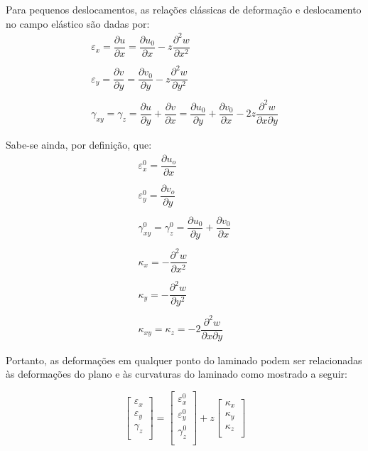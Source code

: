 Para pequenos deslocamentos, as relações clássicas de deformação e deslocamento no campo elástico são dadas por:
\begin{equation} \label{Strain_Displacement}
\begin{gathered}
\varepsilon_{x} = \dfrac{\partial u}{\partial x} = \dfrac{\partial u_0}{\partial x} - z\dfrac{\partial^2 w}{\partial x^2}\\~\\
\varepsilon_{y} = \dfrac{\partial v}{\partial y} = \dfrac{\partial v_0}{\partial y} - z\dfrac{\partial^2 w}{\partial y^2}\\~\\
\gamma_{xy} = \gamma_z = \dfrac{\partial u}{\partial y} + \dfrac{\partial v}{\partial x} = \dfrac{\partial u_0}{\partial y} + \dfrac{\partial v_0}{\partial x} - 2z\dfrac{\partial^2 w}{\partial x\partial y}
\end{gathered}
\end{equation}

Sabe-se ainda, por definição, que:
\begin{equation} \label{Strain_Curvatures}
\begin{gathered}
\varepsilon^0_{x} = \dfrac{\partial u_o}{\partial x}\\~\\
\varepsilon^0_{y} = \dfrac{\partial v_o}{\partial y}\\~\\
\gamma^0_{xy} = \gamma^0_z= \dfrac{\partial u_0}{\partial y} + \dfrac{\partial v_0}{\partial x}\\~\\
\kappa_x = -\dfrac{\partial^2 w}{\partial x^2}\\~\\
\kappa_y = -\dfrac{\partial^2 w}{\partial y^2}\\~\\
\kappa_{xy} = \kappa_z = -2\dfrac{\partial^2 w}{\partial x\partial y}
\end{gathered}
\end{equation}

Portanto, as deformações em qualquer ponto do laminado podem ser relacionadas às deformações do plano e às curvaturas do laminado como mostrado a seguir:

\begin{equation} \label{matrix_strain}
\begin{bmatrix}
    \varepsilon_{x} \\
    \varepsilon_{y} \\
    \gamma_{z} \\
\end{bmatrix}
=
\begin{bmatrix}
		\varepsilon^0_{x} \\
		\varepsilon^0_{y} \\
		\gamma^0_{z} \\
\end{bmatrix}
+z
\begin{bmatrix}
    \kappa_{x} \\
    \kappa_{y} \\
    \kappa_{z} \\
\end{bmatrix}
\end{equation}

